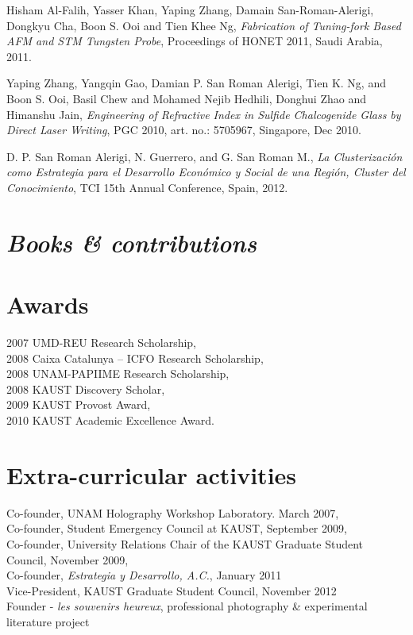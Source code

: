 \documentclass[margin,10pt]{res}
\newcommand{\subs}[1]{\normalfont\emph{\color{Black!90}#1}}
\newcommand{\secs}[1]{\normalsize{\section{\subs{#1}}}}
\begin{document}
Hisham Al-Falih, Yasser Khan, Yaping Zhang, Damain San-Roman-Alerigi, Dongkyu Cha, Boon S. Ooi and Tien Khee Ng, \emph{Fabrication of Tuning-fork Based AFM and STM Tungsten Probe}, Proceedings of HONET 2011, Saudi Arabia, 2011.

Yaping Zhang, Yangqin Gao, Damian P. San Roman Alerigi, Tien K. Ng, and Boon S. Ooi, Basil Chew and Mohamed Nejib Hedhili, Donghui Zhao and Himanshu Jain, \emph{Engineering of Refractive Index in Sulfide Chalcogenide Glass by Direct Laser Writing}, PGC 2010, art. no.: 5705967, Singapore, Dec 2010.

D. P. San Roman Alerigi, N. Guerrero, and G. San Roman M., \emph{La Clusterización como Estrategia para el
Desarrollo Económico y Social de una Región, Cluster del Conocimiento}, TCI 15th Annual Conference, Spain, 2012.

\secs{Books & contributions}


\section{Awards}
2007 UMD-REU Research Scholarship,\\ 
2008 Caixa Catalunya – ICFO Research Scholarship,\\ 
2008 UNAM-PAPIIME Research Scholarship,\\
2008 KAUST Discovery Scholar,\\
2009 KAUST Provost Award,\\
2010 KAUST Academic Excellence Award.\\

\section{Extra-curricular activities}
Co-founder, UNAM Holography Workshop Laboratory. March 2007,\\
Co-founder, Student Emergency Council at KAUST, September 2009, \\
Co-founder, University Relations Chair of the KAUST  Graduate Student Council, November 2009, \\
Co-founder,  \emph{Estrategia y Desarrollo, A.C.}, January 2011\\
Vice-President, KAUST  Graduate Student Council, November 2012 \\ 
Founder - \emph{les souvenirs heureux}, professional photography & experimental literature project\\
\end{document}
